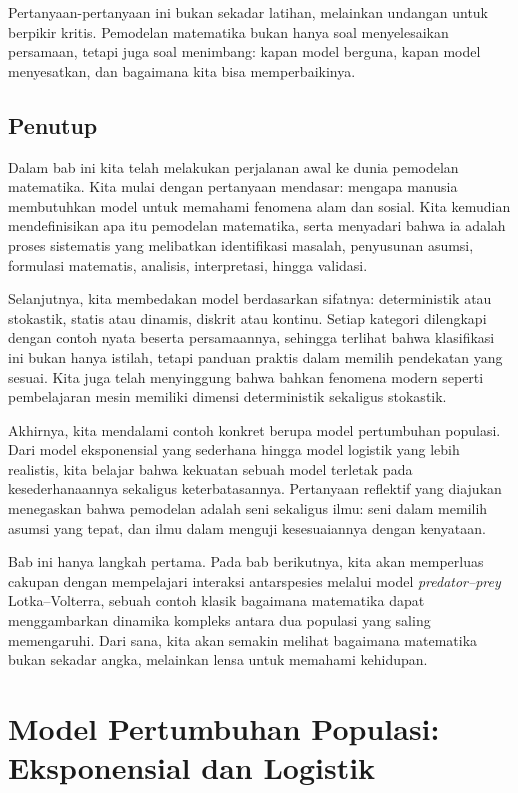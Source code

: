 \documentclass{bukumjh}
\begin{document}
Pertanyaan-pertanyaan ini bukan sekadar latihan, melainkan undangan untuk berpikir kritis. Pemodelan matematika bukan hanya soal menyelesaikan persamaan, tetapi juga soal menimbang: kapan model berguna, kapan model menyesatkan, dan bagaimana kita bisa memperbaikinya.

\section{Penutup}

Dalam bab ini kita telah melakukan perjalanan awal ke dunia pemodelan matematika. Kita mulai dengan pertanyaan mendasar: mengapa manusia membutuhkan model untuk memahami fenomena alam dan sosial. Kita kemudian mendefinisikan apa itu pemodelan matematika, serta menyadari bahwa ia adalah proses sistematis yang melibatkan identifikasi masalah, penyusunan asumsi, formulasi matematis, analisis, interpretasi, hingga validasi.

Selanjutnya, kita membedakan model berdasarkan sifatnya: deterministik atau stokastik, statis atau dinamis, diskrit atau kontinu. Setiap kategori dilengkapi dengan contoh nyata beserta persamaannya, sehingga terlihat bahwa klasifikasi ini bukan hanya istilah, tetapi panduan praktis dalam memilih pendekatan yang sesuai. Kita juga telah menyinggung bahwa bahkan fenomena modern seperti pembelajaran mesin memiliki dimensi deterministik sekaligus stokastik.

Akhirnya, kita mendalami contoh konkret berupa model pertumbuhan populasi. Dari model eksponensial yang sederhana hingga model logistik yang lebih realistis, kita belajar bahwa kekuatan sebuah model terletak pada kesederhanaannya sekaligus keterbatasannya. Pertanyaan reflektif yang diajukan menegaskan bahwa pemodelan adalah seni sekaligus ilmu: seni dalam memilih asumsi yang tepat, dan ilmu dalam menguji kesesuaiannya dengan kenyataan.

Bab ini hanya langkah pertama. Pada bab berikutnya, kita akan memperluas cakupan dengan mempelajari interaksi antarspesies melalui model \textit{predator–prey} Lotka–Volterra, sebuah contoh klasik bagaimana matematika dapat menggambarkan dinamika kompleks antara dua populasi yang saling memengaruhi. Dari sana, kita akan semakin melihat bagaimana matematika bukan sekadar angka, melainkan lensa untuk memahami kehidupan.


\chapter{Model Pertumbuhan Populasi: Eksponensial dan Logistik}
\end{document}
